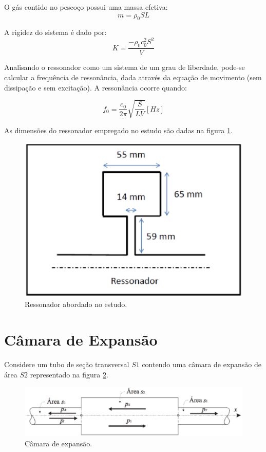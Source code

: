 O gás contido no pescoço possui uma massa efetiva:
\begin{equation}
    m = \rho_{0}SL
\end{equation}

A rigidez do sistema é dado por:
\begin{equation}
    K = \frac{-\rho_{0}c^{2}_{0}S^{2}}{V}
\end{equation}

Analisando o ressonador como um sistema de um grau de liberdade, pode-se calcular a frequência de ressonância, dada através da equação de movimento (sem dissipação e sem excitação). A ressonância ocorre quando:

\begin{equation}
    f_{0} = \frac{c_{0}}{2\pi}\sqrt{\frac{S}{LV}} [Hz]
\end{equation}

\newpage
As dimensões do ressonador empregado no estudo são dadas na figura \ref{ressonador_2}.
\begin{figure}[h]
\centering
\includegraphics[scale=0.45]{ressonador_2.eps}
\caption{Ressonador abordado no estudo.}
\label{ressonador_2}
\end{figure}

\section{Câmara de Expansão}

Considere um tubo de seção transversal $S1$ contendo uma câmara de expansão de área $S2$ representado na figura \ref{camara}.
\begin{figure}[h]
\centering
\includegraphics[scale=0.45]{camara.eps}
\caption{Câmara de expansão.}
\label{camara}
\end{figure}

